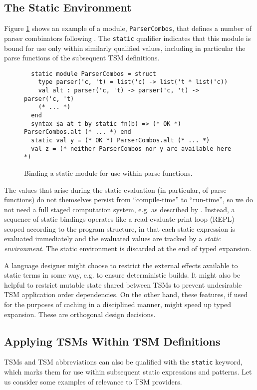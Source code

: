 \documentclass[acmlarge,review,anonymous]{acmart}\settopmatter{printfolios=true}
\newcommand{\li}[1]{\lstinline{#1}}
\begin{document}
\subsection{The Static Environment}
Figure \ref{fig:static-module-example} shows an example of a module, \li{ParserCombos}, that defines a number of parser combinators following \citet{Hutton1992d}. The \li{static} qualifier indicates that this module is bound for use only within similarly qualified values, including in particular the parse functions of the subsequent TSM definitions.
\begin{figure}[h]
\vspace{-10px}
\begin{lstlisting}
  static module ParserCombos = struct 
    type parser('c, 't) = list('c) -> list('t * list('c))
    val alt : parser('c, 't) -> parser('c, 't) -> parser('c, 't)
    (* ... *)
  end
  syntax $a at t by static fn(b) => (* OK *) ParserCombos.alt (* ... *) end 
  static val y = (* OK *) ParserCombos.alt (* ... *)
  val z = (* neither ParserCombos nor y are available here *)
\end{lstlisting}
\vspace{-5px}
\caption{Binding a static module for use within parse functions.}
\label{fig:static-module-example}
\vspace{-10px}
\end{figure}

The values that arise during the static evaluation (in particular, of parse functions) do not themselves persist from ``compile-time'' to ``run-time'', so we do not need a full staged computation system, e.g. as described by \citet{Taha99multi-stageprogramming:}. Instead, a sequence of static bindings operates like a read-evaluate-print loop (REPL) scoped according to the program structure, in that each static expression is evaluated immediately and the evaluated values are tracked by a \emph{static environment}. The static environment is discarded at the end of typed expansion.

A language designer might choose to restrict the external effects available to static terms in some way, e.g. to ensure deterministic builds. It might also be helpful to restrict mutable state shared between TSMs to prevent undesirable TSM application order dependencies. On the other hand, these features, if used for the purposes of caching in a disciplined manner, might speed up typed expansion. These are orthogonal design decisions.


\subsection{Applying TSMs Within TSM Definitions}\label{sec:tsms-for-tsms}
TSMs and TSM abbreviations can also be qualified with the \li{static} keyword, which marks them for use within subsequent static expressions and patterns. Let us consider some examples of relevance to TSM providers.
\end{document}
